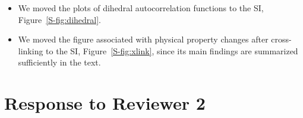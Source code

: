 \documentclass{article}
\begin{document}
\begin{enumerate}
\begin{itemize}
    \item We moved the plots of dihedral autocorrelation functions to the SI, 
    Figure~\ref{S-fig:dihedral}.
    
    \item We moved the figure associated with physical property changes after cross-linking
    to the SI, Figure~\ref{S-fig:xlink}, since its main findings are summarized sufficiently
    in the text.
    
    \end{itemize}
	
\end{enumerate}

\section{Response to Reviewer 2}
\end{document}

